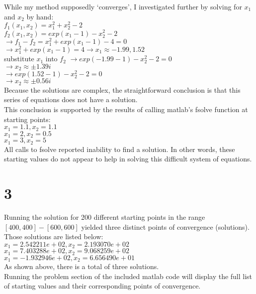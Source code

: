 \documentclass[10pt,a4paper]{article}
\begin{document}
\noindent
While my method supposedly \lq converges\rq, I investigated further by solving for $ x_1 $ and $ x_2 $ by hand: \\

\noindent
$ f_1(x_1,x_2) = x_1^2 + x_2^2 - 2 $ \\
$ f_2(x_1,x_2) = exp(x_1 - 1) - x_2^2 - 2 $ \\
$\rightarrow  f_1 - f_2 = x_1^2 + exp(x_1 - 1) - 4 = 0 $ \\
$\rightarrow  x_1^2 + exp(x_1 - 1) = 4 \rightarrow x_1 \approx -1.99, 1.52 $  \\
substitute $x_1$ into $f_2$  $ \rightarrow exp(-1.99 - 1) - x_2^2 - 2 = 0  $ \\
\indent $ \rightarrow x_2 \approx \pm 1.39i $ \\
$ \rightarrow exp(1.52 - 1) - x_2^2 - 2 = 0 $ \\
\indent $ \rightarrow x_2 \approx \pm 0.56i $ \\

\noindent
Because the solutions are complex, the straightforward  conclusion is that this series of equations does not have a solution. \\

\noindent
This conclusion is supported by the results of calling matlab's fsolve function at starting points: \\
$ x_1 = 1.1, x_2 = 1.1 $ \\
$ x_1 = 2, x_2 = 0.5 $ \\
$ x_1 = 3, x_2 = 5 $ \\

\noindent
All calls to fsolve reported inability to find a solution. In other words, these starting values do not appear to help in solving this difficult system of equations. 

\section*{3}

Running the solution for 200 different starting points in the range $ [400, 400] - [600, 600] $ yielded three distinct points of convergence (solutions). Those solutions are listed below: \\

\noindent
$ x_1 = 2.542211e+02, x_2 = 2.193070e+02 $ \\
$ x_1 = 7.403288e+02, x_2 = 9.068259e+02 $ \\
$ x_1 = -1.932946e+02, x_2 = 6.656490e+01 $ \\

\noindent
As shown above, there is a total of three solutions. \\

\noindent
Running the problem section of the included matlab code will display the full list of starting values and their corresponding points of convergence.
\end{document}

